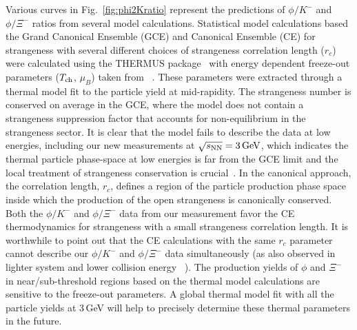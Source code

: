 \documentclass[%
 reprint,	
showpacs,
 amsmath,amssymb,
 aps,
 prc,
]{revtex4-1}
\begin{document}
Various curves in Fig.~\ref{fig:phi2Kratio} represent the predictions of $\phi/K^-$ and $\phi/\Xi^-$ ratios from several model calculations. Statistical model calculations based the Grand Canonical Ensemble (GCE) and Canonical Ensemble (CE) for strangeness with several different choices of strangeness correlation length ($r_c$) were calculated using the THERMUS package~\cite{THERMUS_WHEATON200984} with energy dependent freeze-out parameters ($T_{\rm ch}$, $\mu_B$) taken from ~\cite{Andronic_2018Naure}. These parameters were extracted through a thermal model fit to the particle yield at mid-rapidity. The strangeness number is conserved on average in the GCE, where the model does not contain a strangeness suppression factor that accounts for non-equilibrium in the strangeness sector. %
It is clear that the model fails to describe the data at low energies, including our new measurements at ${\sqrt{s_{\rm NN}} = \rm{3\,GeV}}$, which indicates the thermal particle phase-space at low energies is far from the GCE limit and the local treatment of strangeness conservation is crucial~\cite{BraunMunzinger:2003zd}. In the canonical approach, the correlation length, $r_c$, defines a region of the particle production phase space inside which the production of the open strangeness is canonically conserved. Both the $\phi/K^-$ and $\phi/\Xi^-$ data from our measurement favor the CE thermodynamics for strangeness with a small strangeness correlation length. It is worthwhile to point out that the CE calculations with the same $r_c$ parameter cannot describe our $\phi/K^-$ and $\phi/\Xi^-$ data simultaneously (as also observed in lighter system and lower collision energy ~\cite{HADES_phi_ArKCl}). The production yields of $\phi$ and $\Xi^-$ in near/sub-threshold regions based on the thermal model calculations are sensitive to the freeze-out parameters. 
A global thermal model fit with all the particle yields at 3\,GeV will help to precisely determine these thermal parameters in the future. %
\end{document}
